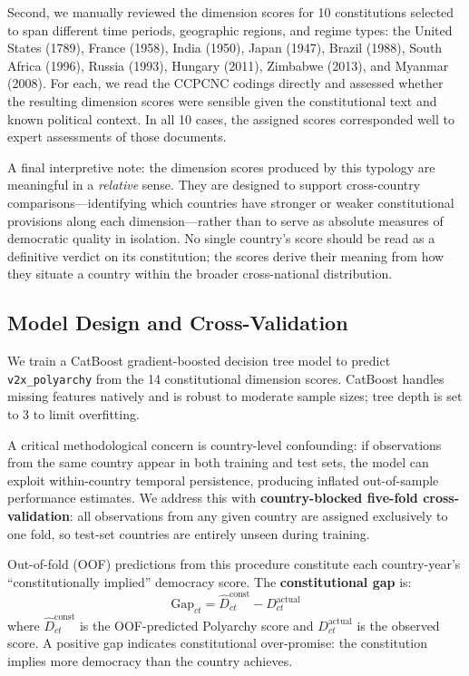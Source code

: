 \documentclass[9pt,twoside]{pnas-new}
\begin{document}
Second, we manually reviewed the dimension scores for 10 constitutions selected to span different time periods, geographic regions, and regime types: the United States (1789), France (1958), India (1950), Japan (1947), Brazil (1988), South Africa (1996), Russia (1993), Hungary (2011), Zimbabwe (2013), and Myanmar (2008). For each, we read the CCPCNC codings directly and assessed whether the resulting dimension scores were sensible given the constitutional text and known political context. In all 10 cases, the assigned scores corresponded well to expert assessments of those documents.

A final interpretive note: the dimension scores produced by this typology are meaningful in a \textit{relative} sense. They are designed to support cross-country comparisons---identifying which countries have stronger or weaker constitutional provisions along each dimension---rather than to serve as absolute measures of democratic quality in isolation. No single country's score should be read as a definitive verdict on its constitution; the scores derive their meaning from how they situate a country within the broader cross-national distribution.

\subsection*{Model Design and Cross-Validation}

We train a CatBoost gradient-boosted decision tree model \cite{prokhorenkova_catboost_2018} to predict \texttt{v2x\_polyarchy} from the 14 constitutional dimension scores. CatBoost handles missing features natively and is robust to moderate sample sizes; tree depth is set to 3 to limit overfitting.

A critical methodological concern is country-level confounding: if observations from the same country appear in both training and test sets, the model can exploit within-country temporal persistence, producing inflated out-of-sample performance estimates. We address this with \textbf{country-blocked five-fold cross-validation}: all observations from any given country are assigned exclusively to one fold, so test-set countries are entirely unseen during training.

Out-of-fold (OOF) predictions from this procedure constitute each country-year's ``constitutionally implied'' democracy score. The \textbf{constitutional gap} is:
\begin{equation}
\text{Gap}_{ct} = \widehat{D}_{ct}^{\text{const}} - D_{ct}^{\text{actual}}
\label{eq:gap}
\end{equation}
where $\widehat{D}_{ct}^{\text{const}}$ is the OOF-predicted Polyarchy score and $D_{ct}^{\text{actual}}$ is the observed score. A positive gap indicates constitutional over-promise: the constitution implies more democracy than the country achieves.
\end{document}

